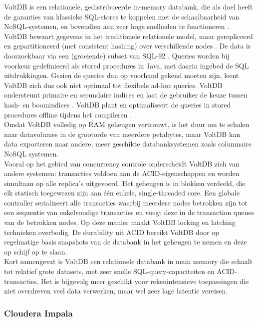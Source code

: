 VoltDB is een relationele, gedistribueerde in-memory databank, die als doel heeft de garanties van klassieke SQL-stores te koppelen met de schaalbaarheid van NoSQL-systemen, en bovendien aan zeer hoge snelheden te functioneren \cite{stonebraker2013voltdb}.\\
VoltDB bewaart gegevens in het traditionele relationele model, maar gerepliceerd en gepartitioneerd (met consistent hashing) over verschillende nodes \cite{grolinger2013data}. De data is doorzoekbaar via een (groeiende) subset van SQL-92 \cite{voltdb2010voltdb}. Queries worden bij voorkeur gedefinieerd als stored procedures in Java, met daarin ingebed de SQL uitdrukkingen. Gezien de queries dan op voorhand gekend moeten zijn, leent VoltDB zich dus ook niet optimaal tot flexibele ad-hoc queries. VoltDB ondersteunt primaire en secundaire indices en laat de gebruiker de keuze tussen hash- en boomindices \cite{voltdb_indexes}. VoltDB plant en optimaliseert de queries in stored procedures offline tijdens het compileren \cite{voltdb_query_plans}.\\
Omdat VoltDB volledig op RAM geheugen vertrouwt, is het duur om te schalen naar datavolumes in de grootorde van meerdere petabytes, maar VoltDB kan data exporteren naar andere, meer geschikte databanksystemen zoals columnaire NoSQL systemen.\\
Vooral op het gebied van concurrency controle onderscheidt VoltDB zich van andere systemen: transacties voldoen aan de ACID-eigenschappen en worden simultaan op alle replica's uitgevoerd. Het geheugen is in blokken verdeeld, die elk statisch toegewezen zijn aan \'e\'en enkele, single-threaded core. Een globale controller serializeert alle transacties waarbij meerdere nodes betrokken zijn tot een sequentie van enkelvoudige transacties en voegt deze in de transaction queues van de betrokken nodes. Op deze manier maakt VoltDB locking en latching technieken overbodig. De durability uit ACID bereikt VoltDB door op regelmatige basis snapshots van de databank in het geheugen te nemen en deze op schijf op te slaan.\\

Kort samengevat is VoltDB een relationele databank in main memory die schaalt tot relatief grote datasets, met zeer snelle SQL-query-capaciteiten en ACID-transacties. Het is bijgevolg meer geschikt voor rekenintensieve toepassingen die niet overdreven veel data verwerken, maar wel zeer lage latentie vereisen.

\subsubsection{Cloudera Impala}

